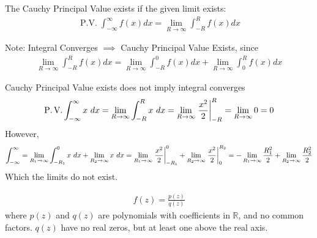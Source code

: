 \documentclass[12pt, english]{book}
\begin{document}
	\begin{definition}
		\label{Cauchy Principal Value Definition - Complex}
		The Cauchy Principal Value exists if the given limit exists:
		\begin{align*}
			\operatorname{P.V.} \int_{-\infty}^{\infty} f(x) dx = \lim_{R\rightarrow \infty} \int_{-R}^{R} f(x) dx
		\end{align*}
	\end{definition}
	
	Note: Integral Converges \(\implies\) Cauchy Principal Value Exists, since 
	\begin{align*}
		\lim_{R\rightarrow \infty} \int_{-R}^{R} f(x) dx
		= \lim_{R\rightarrow \infty} \int_{-R}^{0} f(x) dx 
		+ \lim_{R\rightarrow \infty} \int_{0}^{R} f(x) dx
	\end{align*}
	
	\begin{example} Cauchy Principal Value exists does not imply integral converges
		\begin{align*}
			\operatorname{P.V.} \int_{-\infty}^{\infty} x \ dx 
			= \lim_{R \rightarrow \infty} \int_{-R}^{R} x \ dx 
			= \lim_{R \rightarrow \infty} \eval{\frac{x^2}{2}}_{-R}^{R} 
			= \lim_{R \rightarrow \infty} 0 = 0 
		\end{align*}
		However,
		\begin{align*}
			\int_{-\infty}^{\infty}
			= \lim_{R_1 \rightarrow \infty} \int_{-R_1}^{0} x \ dx + \lim_{R_2 \rightarrow \infty} x \ dx
			= \lim_{R_1 \rightarrow \infty} \eval{\frac{x^2}{2}}_{-R_1}^{0} + \lim_{R_2 \rightarrow \infty} \eval{\frac{x^2}{2}}_{0}^{R_2}
			= - \lim_{R_1 \rightarrow \infty} \frac{R_1^2}{2} + \lim_{R_2 \rightarrow \infty} \frac{R_2^2}{2}
		\end{align*}
		Which the limits do not exist. 
	\end{example}

	
	
	\begin{definition}
		\label{Rational Function Definition - Complex}
		\begin{align*}
			f(z) = \frac{p(z)}{q(z)}
		\end{align*}
		where \(p(z)\) and \(q(z)\) are polynomials with coefficients in \(\mathbb{R}\), and no common factors. \(q(z)\) have no real zeros, but at least one above the real axis.
	\end{definition}
\end{document}
